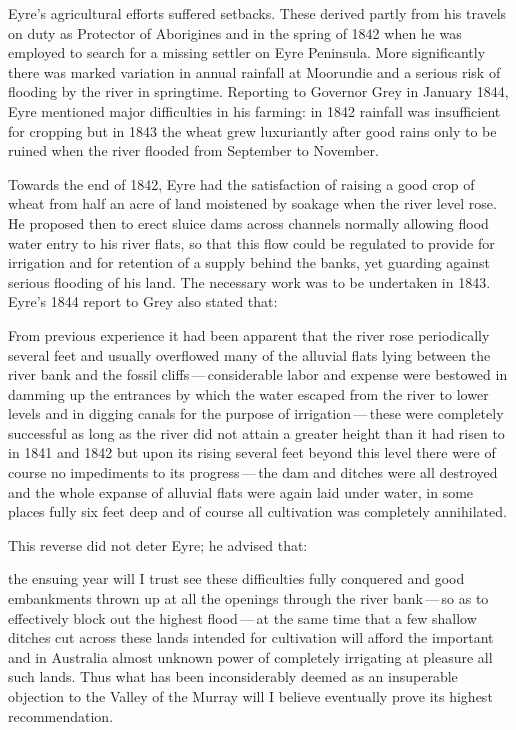 Eyre's agricultural efforts suffered setbacks.  These derived partly
from his travels on duty as Protector of Aborigines
and in the spring of 1842 when he was employed to search for a missing
settler on Eyre Peninsula.  More
significantly there was marked variation in annual rainfall at
Moorundie and a serious risk of flooding by the river in
springtime.  Reporting to Governor Grey in January 1844, Eyre
mentioned major difficulties in his farming: in 1842 rainfall was
insufficient for cropping but in 1843 the wheat grew
luxuriantly after good rains only to be ruined when the river flooded
from September to Nov\-ember.

Towards the end of 1842, Eyre had the satisfaction of raising a good
crop of wheat from half an acre of land moistened by
soakage when the river level rose.  He proposed then to erect
sluice dams across
channels normally allowing
flood water entry to his river flats, so that
this flow could be regulated to provide for irrigation and for
retention of a supply behind the banks, yet guarding against serious
flooding of his land.  The necessary
work was to be undertaken in 1843.  Eyre's 1844 report to Grey also
stated that:
\begin{Quote}
	From previous experience it had been apparent that the river
	rose periodically several feet and usually overflowed many of
	the alluvial flats lying between the river bank and the fossil
	cliffs\,---\,considerable labor and expense were bestowed in
	damming up the entrances by which the
	water escaped from the river to lower levels and in digging
	canals for the purpose of
	irrigation\,---\,these were completely successful as long as
	the river did not attain a greater height than it had risen to
	in 1841 and 1842 but upon its rising several feet beyond this
	level there were of course no impediments to its
	progress\,---\,the dam and ditches were all destroyed and the
	whole expanse of alluvial flats were again laid under water,
	in some places fully six feet deep and of course all
	cultivation was completely annihilated.
\end{Quote}

This reverse did not deter Eyre; he advised that:
\begin{Quote}
	the ensuing year will I trust see these difficulties fully
        conquered and good embankments thrown up at all the openings
        through the river bank\,---\,so as to effectively block out
        the highest flood\,---\,at the same time that a
        few shallow ditches cut across these lands intended for
        cultivation will afford the important and in Australia almost
        unknown power of completely irrigating at pleasure all such
        lands. Thus what has been inconsiderably deemed as an
        insuperable objection to the Valley of the Murray will I
        believe eventually prove its highest
        recommend\-ation.
\end{Quote}


